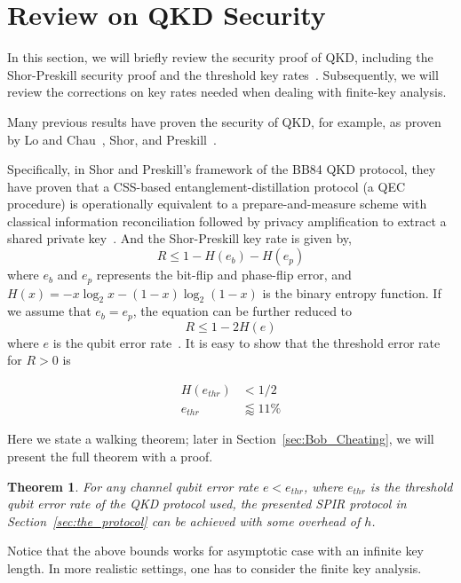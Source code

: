 \documentclass[%
 reprint,
superscriptaddress,
 amsmath,amssymb,
 aps,
]{revtex4-2}
\newtheorem{theorem}{Theorem}[section]
\begin{document}
\appendix

\section{Review on QKD Security}
\label{sec:Review_qkd_security}
In this section, we will briefly review the security proof of QKD, including the Shor-Preskill security proof and the threshold key rates~\cite{Shor_Preskill_Proof1}. Subsequently, we will review the corrections on key rates needed when dealing with finite-key analysis. 

Many previous results have proven the security of QKD, for example, as proven by Lo and Chau~\cite{Lo_Chau_proof}, Shor, and Preskill~\cite{Shor_Preskill_Proof1}.

Specifically, in Shor and Preskill's framework of the BB84 QKD protocol, they have proven that a CSS-based entanglement-distillation protocol (a QEC procedure) is operationally equivalent to a prepare-and-measure scheme with classical information reconciliation followed by privacy amplification to extract a shared private key~\cite{Shor_Preskill_Proof1}. And the Shor-Preskill key rate is given by,
\begin{equation}
    R\le 1-H(e_b)-H(e_p)
\end{equation}
where $e_b$ and $e_p$ represents the bit-flip and phase-flip error, and $H(x)=-x\log_2x-(1-x)\log_2(1-x)$ is the binary entropy function. If we assume that $e_b=e_p$, the equation can be further reduced to
\begin{equation}
    R \le 1-2H(e)
\end{equation}
where $e$ is the qubit error rate~\cite{Shor_Preskill_Proof1}. It is easy to show that the threshold error rate for $R>0$ is

\begin{equation}
\begin{split}
    H(e_{thr})&<1/2\\
    e_{thr}&\lessapprox 11\%
\end{split}
\end{equation}

Here we state a walking theorem; later in Section~\ref{sec:Bob_Cheating}, we will present the full theorem with a proof.

\begin{theorem}
    For any channel qubit error rate $e<e_{thr}$, where $e_{thr}$ is the threshold qubit error rate of the QKD protocol used, the presented SPIR protocol in Section~\ref{sec:the_protocol} can be achieved with some overhead of $h$.
\label{thm:walking_theorem}
\end{theorem}
Notice that the above bounds works for asymptotic case with an infinite key length. In more realistic settings, one has to consider the finite key analysis.
\end{document}
